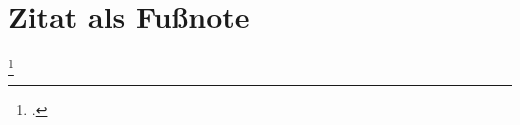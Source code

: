 \documentclass[
    add-bibliography-,                %
    bib-file = biblatex-examples.bib, %
    biblatex/style = authoryear,      %
    language = ngerman,               %
    debug                             %
]{iodhbwm}
\begin{document}
    \chapter{Zitat als Fußnote}
        \blindtext \footcite{doody}
    
        \blindtext {}
\end{document}
